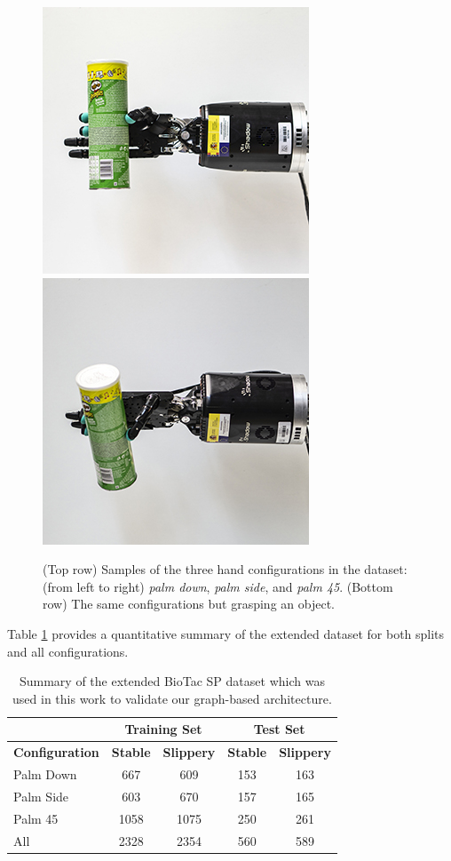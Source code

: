 \begin{figure}[!htb]
    \includegraphics[width=0.32\linewidth]{Figures/Tactile/dataset/palmside_grasp-downsampled}
    \includegraphics[width=0.32\linewidth]{Figures/Tactile/dataset/palm45_grasp-downsampled}
	\caption{(Top row) Samples of the three hand configurations in the dataset: (from left to right) \emph{palm down}, \emph{palm side}, and \emph{palm 45}. (Bottom row) The same configurations but grasping an object.}
	\label{fig:dataset_grasps}
\end{figure}

Table \ref{table:datasets} provides a quantitative summary of the extended dataset for both splits and all configurations.

\begin{table}[!htb]
	\renewcommand{\arraystretch}{1.3}
	\caption{Summary of the extended BioTac SP dataset which was used in this work to validate our graph-based architecture.}
	\label{table:datasets}
	\centering
	\begin{tabular}{lcccc}
        \hline
        & \multicolumn{2}{c}{\textbf{Training Set}} & \multicolumn{2}{c}{\textbf{Test Set}}\\
        \hline
        \textbf{Configuration} & \textbf{Stable} & \textbf{Slippery}  & \textbf{Stable} & \textbf{Slippery} \\
        \hline
        Palm Down & 667 & 609 & 153 & 163 \\
        Palm Side & 603 & 670 & 157 & 165 \\
        Palm 45 & 1058 & 1075 & 250 & 261 \\
        \hline
        All & 2328 & 2354 & 560 & 589 \\
        \hline           
	\end{tabular}
\end{table}

